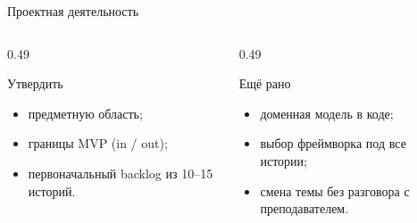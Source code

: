 \begin{frame}{Проектная деятельность}

  \medskip
  \begin{columns}[T]
    \begin{column}{0.49\textwidth}
      \begin{block}{Утвердить}
        \begin{itemize}
          \item предметную область;
          \item границы MVP (in / out);
          \item первоначальный backlog из 10--15 историй.
        \end{itemize}
      \end{block}
    \end{column}
    \begin{column}{0.49\textwidth}
      \begin{block}{Ещё рано}
        \begin{itemize}
          \item доменная модель в коде;
          \item выбор фреймворка \flqq под все истории\frqq;
          \item смена темы без разговора с преподавателем.
        \end{itemize}
      \end{block}
    \end{column}
  \end{columns}
\end{frame}
